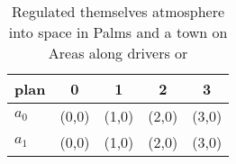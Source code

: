 \documentclass[a4paper]{article}
\begin{document}
\begin{table}
\begin{adjustbox}{width=0.5\columnwidth}
\begin{tabular}{|l|l|l|l|l|}
\hline
\textbf{plan} & \multicolumn{1}{c|}{\textbf{0}} & \multicolumn{1}{c|}{\textbf{1}} & \multicolumn{1}{c|}{\textbf{2}} & \multicolumn{1}{c|}{\textbf{3}} \\ \hline
\textbf{$a_0$}  & (0,0) & (1,0) & (2,0) & (3,0) \\ \hline
\textbf{$a_1$}  & (0,0) & (1,0) & (2,0) & (3,0) \\ \hline
\end{tabular}
\end{adjustbox}
\caption{Regulated themselves atmosphere into space in Palms and a town on Areas along drivers or 
}
\end{table}
\end{document}
